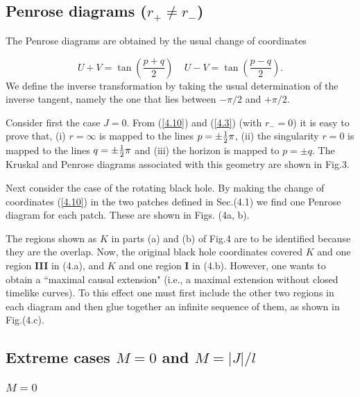 
\subsection{Penrose diagrams ($r_+ \neq r_-$)}


The Penrose diagrams are obtained by the usual change of coordinates

\begin{equation}
U+V = \tan\left(\frac{p+q}{2}\right) \;\;\;\; U-V =
\tan\left(\frac{p-q}{2}\right).
\label{4.10}
\end{equation}
%
We define the inverse transformation by taking the usual determination of the
 inverse tangent, namely the one that lies between $- \pi/2$ and $+ \pi/2$.

Consider first the case $J=0$. From (\ref{4.10}) and (\ref{4.3})
(with $r_-=0$) it is easy to prove that, (i) $r=\infty$ is mapped to
the lines $p=\pm \mbox{$\frac{1}{2}$}\pi$, (ii) the singularity $r=0$ is mapped to
the lines $q=\pm \mbox{$\frac{1}{2}$} \pi$ and (iii) the horizon is mapped to $p=\pm
q$. The Kruskal and Penrose diagrams associated with this
geometry are shown in Fig.3.

Next consider the case of the rotating black hole. By making the
change of coordinates (\ref{4.10}) in the two patches defined in
Sec.(4.1) we find one Penrose diagram for each patch.  These are
shown in Figs. (4a, b).

The regions shown as $K$ in parts (a) and (b) of Fig.4 are to be
identified because they are the overlap. Now, the original black
hole coordinates covered $K$ and one region {\bf III} in (4.a),
and $K$ and one region {\bf I} in (4.b). However, one wants to
obtain a ``maximal causal extension" (i.e., a maximal extension
without closed timelike curves). To this effect one must first
include the other two regions in each diagram and then glue
together an infinite sequence of them, as shown in Fig.(4.c).



\subsection{Extreme cases $M=0$ and $M=|J|/l$}


\subsubsection{{\bf $M=0$}}

